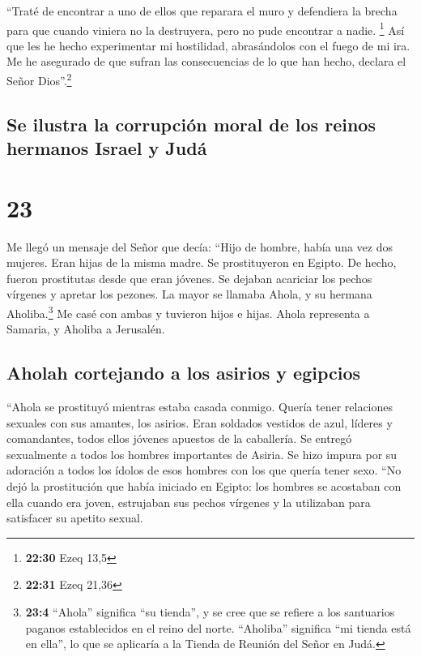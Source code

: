  ``Traté de encontrar a uno de ellos que reparara el muro
y defendiera la brecha para que cuando viniera no la destruyera, pero no
pude encontrar a nadie. \footnote{\textbf{22:30} Ezeq 13,5}
 Así que les he hecho experimentar mi hostilidad,
abrasándolos con el fuego de mi ira. Me he asegurado de que sufran las
consecuencias de lo que han hecho, declara el Señor Dios''.\footnote{\textbf{22:31}
  Ezeq 21,36}

\hypertarget{se-ilustra-la-corrupciuxf3n-moral-de-los-reinos-hermanos-israel-y-juduxe1}{%
\subsection{Se ilustra la corrupción moral de los reinos hermanos Israel
y
Judá}\label{se-ilustra-la-corrupciuxf3n-moral-de-los-reinos-hermanos-israel-y-juduxe1}}

\hypertarget{section-22}{%
\section{23}\label{section-22}}

 Me llegó un mensaje del Señor que decía: 
``Hijo de hombre, había una vez dos mujeres. Eran hijas de la misma
madre.  Se prostituyeron en Egipto. De hecho, fueron
prostitutas desde que eran jóvenes. Se dejaban acariciar los pechos
vírgenes y apretar los pezones.  La mayor se llamaba
Ahola, y su hermana Aholiba.\footnote{\textbf{23:4} ``Ahola'' significa
  ``su tienda'', y se cree que se refiere a los santuarios paganos
  establecidos en el reino del norte. ``Aholiba'' significa ``mi tienda
  está en ella'', lo que se aplicaría a la Tienda de Reunión del Señor
  en Judá.} Me casé con ambas y tuvieron hijos e hijas. Ahola representa
a Samaria, y Aholiba a Jerusalén.

\hypertarget{aholah-cortejando-a-los-asirios-y-egipcios}{%
\subsection{Aholah cortejando a los asirios y
egipcios}\label{aholah-cortejando-a-los-asirios-y-egipcios}}

 ``Ahola se prostituyó mientras estaba casada conmigo.
Quería tener relaciones sexuales con sus amantes, los asirios.
 Eran soldados vestidos de azul, líderes y comandantes,
todos ellos jóvenes apuestos de la caballería.  Se entregó
sexualmente a todos los hombres importantes de Asiria. Se hizo impura
por su adoración a todos los ídolos de esos hombres con los que quería
tener sexo.  ``No dejó la prostitución que había iniciado
en Egipto: los hombres se acostaban con ella cuando era joven,
estrujaban sus pechos vírgenes y la utilizaban para satisfacer su
apetito sexual.

